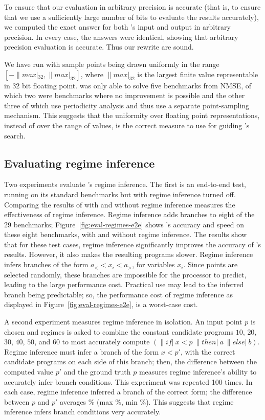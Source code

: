 \documentclass[paper.tex]{subfiles}
\begin{document}
To ensure that our evaluation in arbitrary precision is accurate (that
is, to ensure that we use a sufficiently large number of bits to
evaluate the results accurately), we computed the exact answer for
both \casio's input and output in arbitrary precision.  In every case,
the answers were identical, showing that arbitrary precision
evaluation is accurate. Thus our rewrite are sound.

We have run \casio with sample points being drawn
  uniformly in the range $[-\|max|_{32}, \|max|_{32}]$,
  where $\|max|_{32}$ is the largest finite value
  representable in 32 bit floating point.
\casio was only able to solve five benchmarks from NMSE,
  of which two were benchmarks where no improvement is possible
  and the other three of which use periodicity analysis
  and thus use a separate point-sampling mechanism.
This suggests that the uniformity over floating point representations,
  instead of over the range of values,
  is the correct measure to use for guiding \casio's search.

\subsection{Evaluating regime inference} \label{sec:eval-regimes}

Two experiments evaluate \casio's regime inference.
The first is an end-to-end test,
  running \casio on its standard benchmarks but with regime inference turned off.
Comparing the results of \casio with and without regime inference
  measures the effectiveness of regime inference.
Regime inference adds branches to eight of the 29 benchmarks;
  Figure~\ref{fig:eval-regimes-e2e} shows
  \casio's accuracy and speed on these eight benchmarks,
  with and without regime inference.
The results show that for these test cases, regime inference
  significantly improves the accuracy of \casio's results.
However, it also makes the resulting programs slower.
Regime inference infers branches of the form $a_< < x_i < a_>$,
  for variables $x_i$.
Since points are selected randomly, these branches are
  impossible for the processor to predict,
  leading to the large performance cost.
Practical use may lead to the inferred branch being predictable;
  so, the performance cost of regime inference
  as displayed in Figure~\ref{fig:eval-regimes-e2e},
  is a worst-case cost.

A second experiment measures regime inference in isolation.
An input point $p$ is chosen
  and regimes is asked to combine the constant candidate programs
  $10$, $20$, $30$, $40$, $50$, and $60$
  to most accurately compute $(\|if|\:x < p\:\|then|\:a\:\|else|\:b)$.
Regime inference must infer a branch of the form $x < p'$,
  with the correct candidate programs on each side of this branch;
  then, the difference between the computed value $p'$ and the ground truth $p$
  measures regime inference's ability to accurately infer branch conditions.
This experiment was repeated 100 times.
In each case, regime inference inferred a branch of the correct form;
  the difference between $p$ and $p'$ averages \%
  (max \%, min \%).
This suggests that regime inference infers branch conditions
  very accurately.
\end{document}
